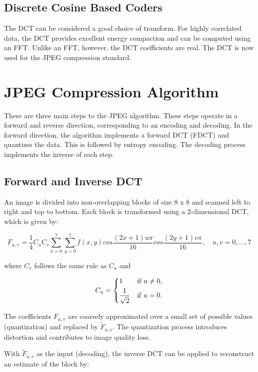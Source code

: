 \documentclass[11pt,a4paper]{article}
\begin{document}
\subsection{Discrete Cosine Based Coders}
The DCT can be considered a good choice of transform. For highly correlated data, the DCT provides excellent energy compaction and can be computed using an FFT. Unlike an FFT, however, the DCT coefficients are real. The DCT is now used for the JPEG compression standard.

\section{JPEG Compression Algorithm}
There are three main steps to the JPEG algorithm. These steps operate in a forward and reverse direction, corresponding to an encoding and decoding. In the forward direction, the algorithm implements a forward DCT (FDCT) and quantizes the data. This is followed by entropy encoding. The decoding process implements the inverse of each step.

\subsection{Forward and Inverse DCT}
An image is divided into non-overlapping blocks of size 8 x 8 and scanned left to right and top to bottom. Each block is transformed using a 2-dimensional DCT, which is given by:

\begin{equation}
F_{u,v} = \frac{1}{4}C_u C_v \sum_{x=0}^{7} \sum_{y=0}^{7}
	f(x,y)cos\frac{(2x+1)u\pi}{16}cos\frac{(2y+1)v\pi}{16}, \quad u,v = 0,\ldots ,7
\end{equation}

where $C_v$ follows the same rule as $C_u$ and

\begin{align*}
C_u = 
	\begin{dcases}
		1 \quad &\text{if $u\neq 0$,} \\
		\frac{1}{\sqrt{2}} &\text{if $u = 0$.}
	\end{dcases}
\end{align*}

The coefficients $F_{u,v}$ are coarsely approximated over a small set of possible values (quantization) and replaced by $\tilde{F}_{u,v}$. The quantization process introduces distortion and contributes to image quality loss.

With $\tilde{F}_{u,v}$ as the input (decoding), the inverse DCT can be applied to reconstruct an estimate of the block by:
\end{document}
